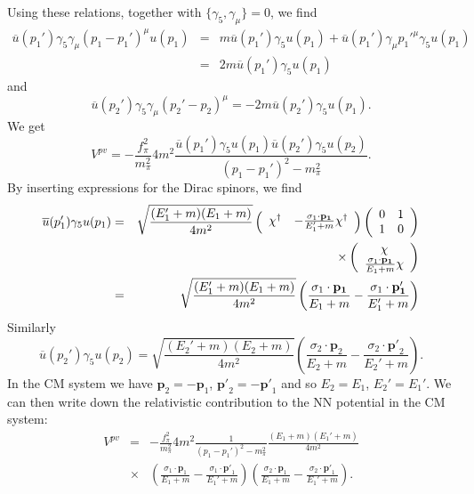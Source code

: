 \documentclass[graybox,sectrefs,envcountresetchap,open=right]{svmonodo}
\begin{document}
\noindent
Using these relations, together with $\{\gamma_{5},\gamma_{\mu}\}=0$, we find 
\begin{eqnarray*}
\overline{u}(p_{1}')\gamma_{5}\gamma_{\mu}(p_{1}-p_{1}')^{\mu}u(p_{1})
&=&m\overline{u}(p_{1}')\gamma_{5}u(p_{1})+\overline{u}(p_{1}')\gamma_{\mu}
p_{1}'^{\mu}\gamma_{5}u(p_{1}) \nonumber \\
 &=&2m\overline{u}(p_{1}')\gamma_{5}u(p_{1}) \nonumber
\end{eqnarray*}
and 
\[
\overline{u}(p_{2}')\gamma_{5}\gamma_{\mu}(p_{2}'-p_{2})^{\mu}=
-2m\overline{u}(p_{2}')\gamma_{5}u(p_{1}).
\]
We get
\[
V^{pv}=-\frac{f_{\pi}^{2}}{m_{\pi}^{2}}4m^{2}\frac{\overline{u}(p_{1}')
\gamma_{5}u(p_{1})\overline{u}(p_{2}')\gamma_{5}u(p_{2})}{(p_{1}-p_{1}')
^{2}-m_{\pi}^{2}}.
\]
By inserting expressions for the Dirac spinors, we find
\begin{eqnarray*}
\overline{u}(p_{1}')\gamma_{5}u(p_{1})&=&\sqrt{\frac{(E_{1}'+m)(E_{1}+m)}
{4m^{2}}}\left(\begin{array}{cc}\chi^{\dagger}&-\frac{\sigma_{1}\cdot{
\bf p_{1}}}{E_{1}'
+m}\chi^{\dagger}\end{array}\right)\left(\begin{array}{cc}0&1\\1&0\end{array}
\right)\nonumber \\
 &&\times \left(\begin{array}{c}\chi\\ \frac{\sigma_{1}\cdot\mathbf{p_{1}}}{E_{1}+m}\chi
\end{array}\right) 
\nonumber \\
 &=&\sqrt{\frac{(E_{1}'+m)(E_{1}+m)}{4m^{2}}}\left(\frac{\sigma_{1}\cdot
\mathbf{p_{1}}}{E_{1}+m}-\frac{\sigma_{1}\cdot\mathbf{p_{1}'}}{E_{1}'+m}\right) 
\nonumber 
\end{eqnarray*}
Similarly
\[
\overline{u}(p_{2}')\gamma_{5}u(p_{2})=\sqrt{\frac{(E_{2}'+m)(E_{2}+m)}
{4m^{2}}}\left(\frac{\sigma_{2}\cdot \mathbf{p}_{2}}{E_{2}+m}-
\frac{\sigma_{2}\cdot\mathbf{p'}_{2}}{E_{2}'+m}\right).
\]
In the CM system we have $\mathbf{p}_{2}=-\mathbf{p}_{1}$, $\mathbf{p'}_{2}=
-\mathbf{p'}_{1}$ and so $E_{2}=E_{1}$, $E_{2}'=E_{1}'$.  
We can then write down the relativistic contribution 
to the NN potential in the CM system: 
\begin{eqnarray}
V^{pv}&=&-\frac{f_{\pi}^{2}}{m_{\pi}^{2}}4m^{2}\frac{1}{(p_{1}-p_{1}')^{2}-
m_{\pi}^{2}}\frac{(E_{1}+m)(E_{1}'+m)}{4m^{2}} \nonumber \\ 
 &\times&\left(\frac{\sigma_{1}\cdot\mathbf{p}_{1}}{E_{1}+m}-\frac{\sigma_{1}
\cdot\mathbf{p'}_{1}}{E_{1}'+m}\right)\left(\frac{\sigma_{2}\cdot\mathbf{p}_{1}}
{E_{1}+m}-\frac{\sigma_{2}\cdot\mathbf{p'}_{1}}{E_{1}'+m}\right). \nonumber
\end{eqnarray}
\end{document}
